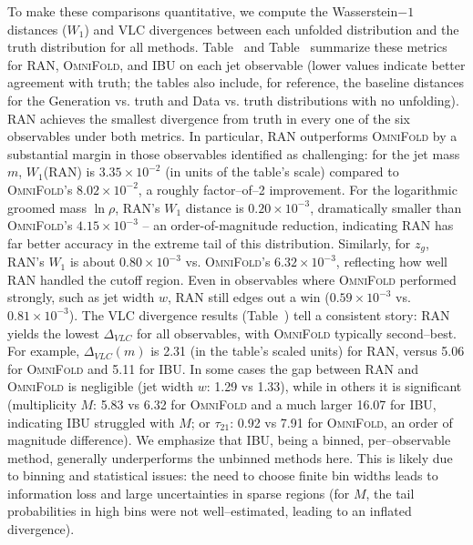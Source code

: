             To make these comparisons quantitative, we compute the Wasserstein\(-1\) distances ($W_1$) and VLC divergences between each unfolded distribution and the truth distribution for all methods.
            Table~ and Table~ summarize these metrics for RAN, \textsc{OmniFold}, and IBU on each jet observable (lower values indicate better agreement with truth; the tables also include, for reference, the baseline distances for the Generation vs. truth and Data vs. truth distributions with no unfolding).
            RAN achieves the smallest divergence from truth in every one of the six observables under both metrics.
            In particular, RAN outperforms \textsc{OmniFold} by a substantial margin in those observables identified as challenging: for the jet mass $m$, $W_1$(RAN) is $3.35\times10^{-2}$ (in units of the table’s scale) compared to \textsc{OmniFold}’s $8.02\times10^{-2}$, a roughly factor--of--2 improvement.
            For the logarithmic groomed mass $\ln\rho$, RAN’s $W_1$ distance is $0.20\times10^{-3}$, dramatically smaller than \textsc{OmniFold}’s $4.15\times10^{-3}$ – an order-of-magnitude reduction, indicating RAN has far better accuracy in the extreme tail of this distribution.
            Similarly, for $z_g$, RAN’s $W_1$ is about $0.80\times10^{-3}$ vs. \textsc{OmniFold}’s $6.32\times10^{-3}$, reflecting how well RAN handled the cutoff region.
            Even in observables where \textsc{OmniFold} performed strongly, such as jet width $w$, RAN still edges out a win ($0.59\times10^{-3}$ vs. $0.81\times10^{-3}$).
            The VLC divergence results (Table~) tell a consistent story: RAN yields the lowest $\Delta_{VLC}$ for all observables, with \textsc{OmniFold} typically second--best.
            For example, $\Delta_{VLC}(m)$ is 2.31 (in the table’s scaled units) for RAN, versus 5.06 for \textsc{OmniFold} and 5.11 for IBU.
            In some cases the gap between RAN and \textsc{OmniFold} is negligible (jet width $w$: 1.29 vs 1.33), while in others it is significant (multiplicity $M$: 5.83 vs 6.32 for \textsc{OmniFold} and a much larger 16.07 for IBU, indicating IBU struggled with $M$; or $\tau_{21}$: 0.92 vs 7.91 for \textsc{OmniFold}, an order of magnitude difference).
            We emphasize that IBU, being a binned, per--observable method, generally underperforms the unbinned methods here.
            This is likely due to binning and statistical issues: the need to choose finite bin widths leads to information loss and large uncertainties in sparse regions (for $M$, the tail probabilities in high bins were not well--estimated, leading to an inflated divergence).
